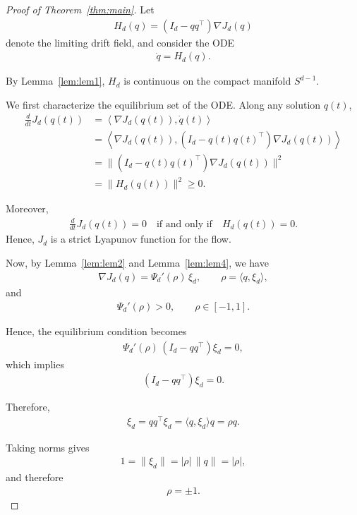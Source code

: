 \documentclass[11pt,a4paper]{article}
\theoremstyle{definition}
\begin{document}
\begin{proof}[Proof of Theorem~\ref{thm:main}]
Let
\begin{align*}
H_d(q)
=
(I_d - qq^\top)\nabla J_d(q)
\end{align*}
denote the limiting drift field, and consider the ODE
\begin{align}
\dot q = H_d(q).
\end{align}

By Lemma~\ref{lem:lem1}, $H_d$ is continuous on the compact manifold $S^{d-1}$.

We first characterize the equilibrium set of the ODE. Along any solution $q(t)$,
\begin{align*}
\frac{d}{dt}J_d(q(t))
&=
\left\langle \nabla J_d(q(t)), \dot q(t) \right\rangle \\
&=
\left\langle \nabla J_d(q(t)), (I_d - q(t)q(t)^\top)\nabla J_d(q(t)) \right\rangle \\
&=
\|(I_d - q(t)q(t)^\top)\nabla J_d(q(t))\|^2 \\
&=
\|H_d(q(t))\|^2 \ge 0.
\end{align*}

Moreover,
\begin{align}
\frac{d}{dt}J_d(q(t)) = 0
\quad \text{if and only if} \quad
H_d(q(t)) = 0.
\end{align}
Hence, $J_d$ is a strict Lyapunov function for the flow.

Now, by Lemma~\ref{lem:lem2} and Lemma~\ref{lem:lem4}, we have
\begin{align}
\nabla J_d(q)
=
\Psi_d'(\rho)\,\xi_d,
\qquad
\rho=\langle q,\xi_d\rangle,
\end{align}
and
\begin{align}
\Psi_d'(\rho) > 0,
\qquad
\rho \in [-1,1].
\end{align}

Hence, the equilibrium condition becomes
\begin{align}
\Psi_d'(\rho)\,(I_d - qq^\top)\xi_d = 0,
\end{align}
which implies
\begin{align}
(I_d - qq^\top)\xi_d = 0.
\end{align}

Therefore,
\begin{align}
\xi_d
=
qq^\top\xi_d
=
\langle q,\xi_d\rangle q
=
\rho q.
\end{align}

Taking norms gives
\begin{align}
1 = \|\xi_d\|
=
|\rho|\,\|q\|
=
|\rho|,
\end{align}
and therefore
\begin{align}
\rho = \pm 1.
\end{align}


\end{proof}
\end{document}
